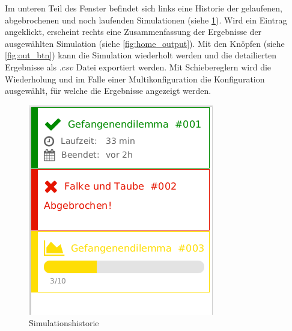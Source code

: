 \documentclass[parskip=full,11pt]{scrartcl}
\begin{document}
\newpage
Im unteren Teil des Fenster befindet sich links eine Historie der gelaufenen, abgebrochenen und noch laufenden Simulationen (siehe \cref{fig:history}). Wird ein Eintrag angeklickt, erscheint rechts eine Zusammenfassung der Ergebnisse der ausgewählten Simulation (siehe \cref{fig:home_output}). Mit den Knöpfen (siehe \cref{fig:out_btn}) kann die Simulation wiederholt werden und die detailierten Ergebnisse als \(.csv\) Datei exportiert werden. Mit Schiebereglern wird die Wiederholung und im Falle einer Multikonfiguration die Konfiguration ausgewählt, für welche die Ergebnisse angezeigt werden.



\begin{figure}[hb]
	\centering
	\includegraphics[height=0.5\linewidth ]{images/history.png}
	\caption{\label{fig:history}
		Simulationshistorie }
\end{figure}
\end{document}
